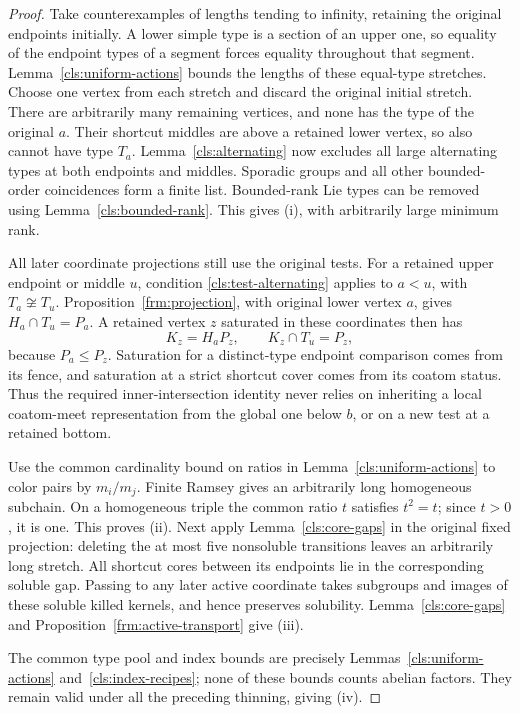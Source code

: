\begin{proof}
Take counterexamples of lengths tending to infinity, retaining the
original endpoints initially.  A lower simple type is a section of
an upper one, so equality of the endpoint types of a segment forces
equality throughout that segment.  Lemma~\ref{cls:uniform-actions}
bounds the lengths of these equal-type stretches.  Choose one
vertex from each stretch and discard the original initial stretch.
There are arbitrarily many remaining vertices, and none has the
type of the original $a$.  Their shortcut middles are above a
retained lower vertex, so also cannot have type $T_a$.
Lemma~\ref{cls:alternating} now excludes all large alternating
types at both endpoints and middles.  Sporadic groups and all other
bounded-order coincidences form a finite list.  Bounded-rank Lie
types can be removed using Lemma~\ref{cls:bounded-rank}.  This gives
(i), with arbitrarily large minimum rank.

All later coordinate projections still use the original tests.
For a retained upper endpoint or middle $u$, condition
\ref{cls:test-alternating} applies to $a<u$, with
$T_a\not\cong T_u$.  Proposition~\ref{frm:projection}, with
original lower vertex $a$, gives $H_a\cap T_u=P_a$.  A retained
vertex $z$ saturated in these coordinates then has
\[
 K_z=H_aP_z,\qquad K_z\cap T_u=P_z,
\]
because $P_a\leq P_z$.  Saturation for a distinct-type endpoint
comparison comes from its fence, and saturation at a strict
shortcut cover comes from its coatom status.  Thus the required
inner-intersection identity never relies on inheriting a local
coatom-meet representation from the global one below $b$, or on a
new test at a retained bottom.

Use the common cardinality bound on ratios in
Lemma~\ref{cls:uniform-actions} to color pairs by $m_i/m_j$.
Finite Ramsey gives an arbitrarily long homogeneous subchain.
On a homogeneous triple the common ratio $t$ satisfies $t^2=t$;
since $t>0$, it is one.  This proves (ii).  Next apply
Lemma~\ref{cls:core-gaps} in the original fixed projection: deleting
the at most five nonsoluble transitions leaves an arbitrarily long
stretch.  All shortcut cores between its endpoints lie in the
corresponding soluble gap.  Passing to any later active coordinate
takes subgroups and images of these soluble killed kernels, and
hence preserves solubility.  Lemma~\ref{cls:core-gaps} and
Proposition~\ref{frm:active-transport} give (iii).

The common type pool and index bounds are precisely
Lemmas~\ref{cls:uniform-actions} and~\ref{cls:index-recipes}; none of
these bounds counts abelian factors.  They remain valid under all
the preceding thinning, giving (iv).


\end{proof}
